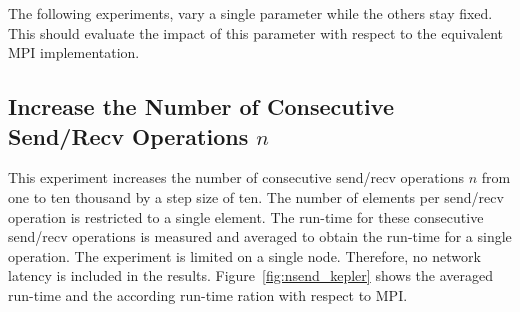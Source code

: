 \noindent The following experiments, vary a single parameter while the
others stay fixed. This should evaluate the impact of this parameter
with respect to the equivalent MPI implementation.

\subsection*{Increase the Number of Consecutive Send/Recv Operations $n$}
This experiment increases the number of consecutive send/recv
operations $n$ from one to ten thousand by a step size of ten. The number of
elements per send/recv operation is restricted to a single
element. The run-time for these consecutive send/recv operations is
measured and averaged to obtain the run-time for a single operation.
The experiment is limited on a single node. Therefore, no network
latency is included in the results.  Figure~\ref{fig:nsend_kepler}
shows the averaged run-time and the according
run-time ration with respect to MPI.

